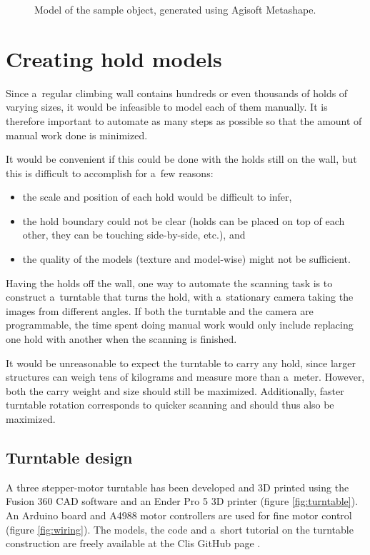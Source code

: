 \begin{figure}[b]
	\centering
	\hfill
	\caption{Model of the sample object, generated using Agisoft Metashape.}%
\end{figure}

\section{Creating hold models}
Since a~regular climbing wall contains hundreds or even thousands of holds of varying sizes, it would be infeasible to model each of them manually.
It is therefore important to automate as many steps as possible so that the amount of manual work done is minimized.

It would be convenient if this could be done with the holds still on the wall, but this is difficult to accomplish for a~few reasons:
\begin{itemize}
	\item the scale and position of each hold would be difficult to infer,
	\item the hold boundary could not be clear (holds can be placed on top of each other, they can be touching side-by-side, etc.), and
	\item the quality of the models (texture and model-wise) might not be sufficient.
\end{itemize}

Having the holds off the wall, one way to automate the scanning task is to construct a~turntable that turns the hold, with a~stationary camera taking the images from different angles.
If both the turntable and the camera are programmable, the time spent doing manual work would only include replacing one hold with another when the scanning is finished.

It would be unreasonable to expect the turntable to carry any hold, since larger structures can weigh tens of kilograms and measure more than a~meter.
However, both the carry weight and size should still be maximized.
Additionally, faster turntable rotation corresponds to quicker scanning and should thus also be maximized.

\subsection{Turntable design}
A three stepper-motor turntable has been developed and 3D printed using the Fusion 360 CAD software \cite{fusion} and an Ender Pro 5 3D printer (figure \ref{fig:turntable}).
An Arduino board and A4988 motor controllers are used for fine motor control (figure \ref{fig:wiring}).
The models, the code and a~short tutorial on the turntable construction are freely available at the Clis GitHub page \cite{clis}.


